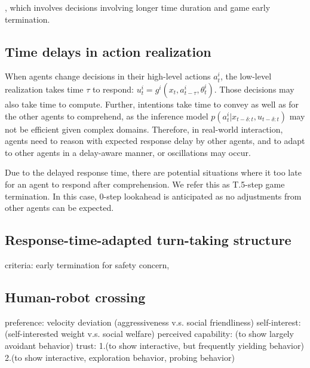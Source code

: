 \documentclass[letterpaper, 10 pt, conference]{ieeeconf}  %
\begin{document}
, which involves 
decisions involving longer time duration and game early termination.
\subsection{Time delays in action realization}
When agents change decisions in their high-level actions $a^i_t$, the 
low-level realization takes 
time $\tau$ to respond: $u^i_t = g^i(x_t,a^i_{t-\tau},\theta^i_t)$. Those 
decisions may also take time to compute.
Further, intentions take time to convey as well as for the other 
agents to comprehend, as the inference model 
$p(a^i_t|x_{t-\delta:t},u_{t-\delta:t})$ 
may not be efficient given complex domains. Therefore, in real-world 
interaction, agents need to reason with expected response delay by other 
agents, and to adapt to other agents in a delay-aware manner, or oscillations 
may occur. 

Due to the delayed response time, there are potential situations where it too late for an 
agent to respond after comprehension. We refer this as T.5-step game 
termination. In this case, 0-step lookahead is anticipated as no 
adjustments from other agents can be expected.

\subsection{Response-time-adapted turn-taking structure}

criteria: early termination for safety concern, 
\subsection{Human-robot crossing}
preference: velocity deviation (aggressiveness v.s. social friendliness)
self-interest: (self-interested weight v.s. social welfare)
perceived capability: (to show largely avoidant behavior)
trust: 
1.(to show interactive, but frequently yielding behavior)
2.(to show interactive, exploration behavior, probing behavior)






\end{document}
